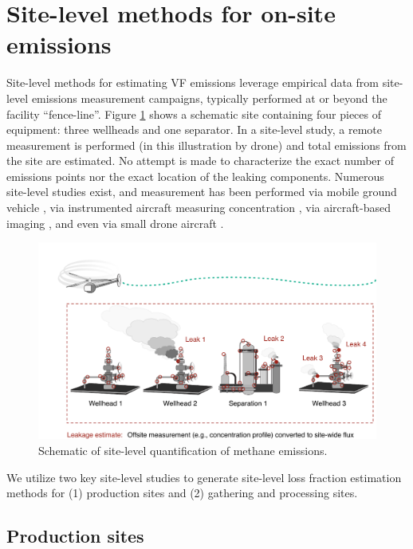 \documentclass[11pt]{report}
\begin{document}
\section{Site-level methods for on-site emissions}

Site-level methods for estimating VF emissions leverage empirical data from site-level emissions measurement campaigns, typically performed at or beyond the facility ``fence-line''. Figure \ref{fig:Site_VF} shows a schematic site containing four pieces of equipment: three wellheads and one separator. In a site-level study, a remote measurement is performed (in this illustration by drone) and total emissions from the site are estimated. No attempt is made to characterize the exact number of emissions points nor the exact location of the leaking components. Numerous site-level studies exist, and measurement has been performed via mobile ground vehicle \cite{Brantley2014, Goetz2017, Lan2015, Omara2016, Yacovitch2015, Rella2015, Robertson2017, Bell2017}, via instrumented aircraft measuring concentration \cite{Conley2016, Schwietzke2017, Englander2018, Lavoie2015, Lavoie2017a, Lavoie2017b, Mehrotra2017}, via aircraft-based imaging \cite{Frankenberg2016}, and even via small drone aircraft \cite{Nathan2015}.


\begin{figure}[t]
\includegraphics[width=1\columnwidth]{images/Site_VF.pdf}
\caption{Schematic of site-level quantification of methane emissions.}
\label{fig:Site_VF}
\end{figure}

We utilize two key site-level studies to generate site-level loss fraction estimation methods for (1) production sites and (2) gathering and processing sites.

\subsection{Production sites}
\end{document}
